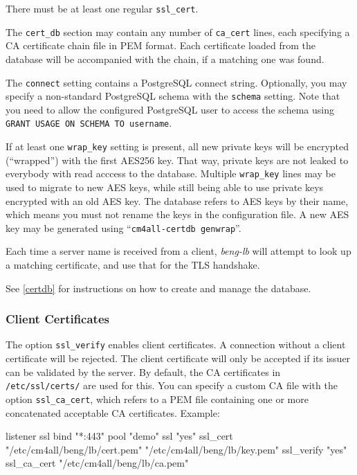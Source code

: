 \documentclass[a4paper,12pt]{article}
\begin{document}
There must be at least one regular \verb|ssl_cert|.

The \verb|cert_db| section may contain any number of \verb|ca_cert|
lines, each specifying a CA certificate chain file in PEM format.
Each certificate loaded from the database will be accompanied with the
chain, if a matching one was found.

The \verb|connect| setting contains a PostgreSQL connect string.
Optionally, you may specify a non-standard PostgreSQL schema with the
\verb|schema| setting.  Note that you need to allow the configured
PostgreSQL user to access the schema using \texttt{GRANT USAGE ON
  SCHEMA TO username}.

If at least one \verb|wrap_key| setting is present, all new private
keys will be encrypted (``wrapped'') with the first AES256 key.  That
way, private keys are not leaked to everybody with read acccess to the
database.  Multiple \verb|wrap_key| lines may be used to migrate to
new AES keys, while still being able to use private keys encrypted
with an old AES key.  The database refers to AES keys by their name,
which means you must not rename the keys in the configuration file.  A
new AES key may be generated using ``\verb|cm4all-certdb genwrap|''.

Each time a server name is received from a client, \emph{beng-lb} will
attempt to look up a matching certificate, and use that for the TLS
handshake.

See \ref{certdb} for instructions on how to create and manage the
database.

\subsubsection{Client Certificates}

The option \verb|ssl_verify| enables client certificates.  A
connection without a client certificate will be rejected.  The client
certificate will only be accepted if its issuer can be validated by
the server.  By default, the CA certificates in \verb|/etc/ssl/certs/|
are used for this.  You can specify a custom CA file with the option
\verb|ssl_ca_cert|, which refers to a PEM file containing one or more
concatenated acceptable CA certificates.  Example:

\begin{verbatim*}
listener ssl {
  bind "*:443"
  pool "demo"
  ssl "yes"
  ssl_cert "/etc/cm4all/beng/lb/cert.pem" "/etc/cm4all/beng/lb/key.pem"
  ssl_verify "yes"
  ssl_ca_cert "/etc/cm4all/beng/lb/ca.pem"
}
\end{verbatim*}
\end{document}
